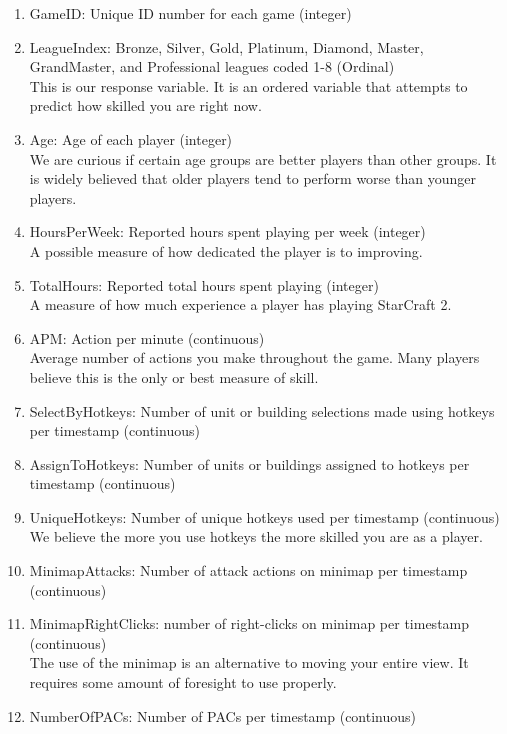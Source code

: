 \documentclass[letterpaper,10pt,english]{/usr/share/sphinx/texinputs/sphinxhowto}
\begin{document}
\begin{enumerate}[1.]
\item
  GameID: Unique ID number for each game (integer)
\item
  LeagueIndex: Bronze, Silver, Gold, Platinum, Diamond, Master,
  GrandMaster, and Professional leagues coded 1-8 (Ordinal)\\This is our
  response variable. It is an ordered variable that attempts to predict
  how skilled you are right now.
\item
  Age: Age of each player (integer)\\We are curious if certain age
  groups are better players than other groups. It is widely believed
  that older players tend to perform worse than younger players.
\item
  HoursPerWeek: Reported hours spent playing per week (integer)\\A
  possible measure of how dedicated the player is to improving.
\item
  TotalHours: Reported total hours spent playing (integer)\\A measure of
  how much experience a player has playing StarCraft 2.
\item
  APM: Action per minute (continuous)\\Average number of actions you
  make throughout the game. Many players believe this is the only or
  best measure of skill.
\item
  SelectByHotkeys: Number of unit or building selections made using
  hotkeys per timestamp (continuous)\\
\item
  AssignToHotkeys: Number of units or buildings assigned to hotkeys per
  timestamp (continuous)\\
\item
  UniqueHotkeys: Number of unique hotkeys used per timestamp
  (continuous)\\We believe the more you use hotkeys the more skilled you
  are as a player.
\item
  MinimapAttacks: Number of attack actions on minimap per timestamp
  (continuous)\\
\item
  MinimapRightClicks: number of right-clicks on minimap per timestamp
  (continuous)\\The use of the minimap is an alternative to moving your
  entire view. It requires some amount of foresight to use properly.
\item
  NumberOfPACs: Number of PACs per timestamp (continuous)\\

\end{enumerate}
\end{document}

